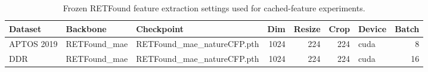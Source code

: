 \begin{table}[t]
\centering
\footnotesize
\caption{Frozen RETFound feature extraction settings used for cached-feature experiments.}
\label{tab:feature-summary}
\begin{tabularx}{\textwidth}{l l X r r r l r}
\toprule
Dataset & Backbone & Checkpoint & Dim & Resize & Crop & Device & Batch \\
\midrule
APTOS 2019 & RETFound\_mae & RETFound\_mae\_natureCFP.pth & 1024 & 224 & 224 & cuda & 8 \\
DDR & RETFound\_mae & RETFound\_mae\_natureCFP.pth & 1024 & 224 & 224 & cuda & 16 \\
\bottomrule
\end{tabularx}
\end{table}
